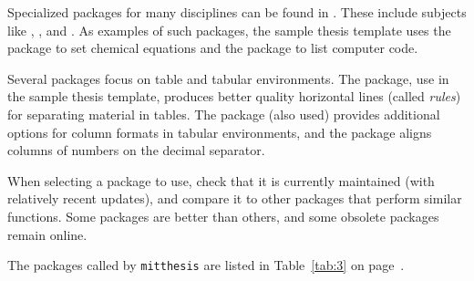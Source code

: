 \documentclass[11pt]{article}
\begin{document}
Specialized packages for many disciplines can be found in .  These include subjects like , , and .  As examples of such packages, the sample thesis template uses the package \texttt{} to set chemical equations and the package \texttt{} to list computer code.

Several packages focus on table and tabular environments.  The \texttt{} package, use in the sample thesis template, produces better quality horizontal lines (called \textit{rules}) for separating material in tables.  The \texttt{} package (also used) provides additional options for column formats in tabular environments, and the \texttt{} package aligns columns of numbers on the decimal separator. 

When selecting a package to use, check that it is currently maintained (with relatively recent updates), and compare it to other packages that perform similar functions.  Some packages are better than others, and some obsolete packages remain online.

The packages called by \texttt{mitthesis} are listed in Table~\ref{tab:3} on page~\pageref{tab:3}.
\end{document}
